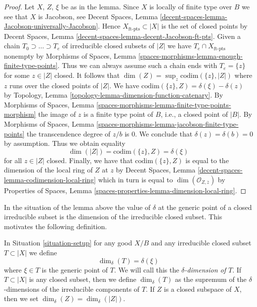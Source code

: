 \begin{proof}
Let $X$, $Z$, $\xi$ be as in the lemma.
Since $X$ is locally of finite type over $B$ we see that $X$ is Jacobson, see
Decent Spaces, Lemma
\ref{decent-spaces-lemma-Jacobson-universally-Jacobson}.
Hence $X_{\text{ft-pts}} \subset |X|$ is the set of closed points
by Decent Spaces, Lemma \ref{decent-spaces-lemma-decent-Jacobson-ft-pts}.
Given a chain $T_0 \supset \ldots \supset T_e$
of irreducible closed subsets of $|Z|$ we have
$T_e \cap X_{\text{ft-pts}}$ nonempty by
Morphisms of Spaces, Lemma
\ref{spaces-morphisms-lemma-enough-finite-type-points}.
Thus we can always assume such a chain ends
with $T_e = \{z\}$ for some $z \in |Z|$ closed.
It follows that $\dim(Z) = \sup_z \text{codim}(\{z\}, |Z|)$
where $z$ runs over the closed points of $|Z|$.
We have $\text{codim}(\{z\}, Z) = \delta(\xi) - \delta(z)$
by Topology, Lemma \ref{topology-lemma-dimension-function-catenary}.
By Morphisms of Spaces, Lemma
\ref{spaces-morphisms-lemma-finite-type-points-morphism}
the image of $z$ is a finite type point of $B$, i.e.,
a closed point of $|B|$. By
Morphisms of Spaces, Lemma
\ref{spaces-morphisms-lemma-jacobson-finite-type-points}
the transcendence degree of $z/b$ is $0$.
We conclude that $\delta(z) = \delta(b) = 0$ by assumption.
Thus we obtain equality
$$
\dim(|Z|) = \text{codim}(\{z\}, Z) = \delta(\xi)
$$
for all $z \in |Z|$ closed. Finally, we have that
$\text{codim}(\{z\}, Z)$ is equal to the dimension of the
local ring of $Z$ at $z$ by
Decent Spaces, Lemma \ref{decent-spaces-lemma-codimension-local-ring}
which in turn is equal to
$\dim(\mathcal{O}_{Z, \overline{z}})$ by
Properties of Spaces, Lemma \ref{spaces-properties-lemma-dimension-local-ring}.
\end{proof}

\noindent
In the situation of the lemma above the value of $\delta$
at the generic point of a closed irreducible subset
is the dimension of the irreducible closed subset.
This motivates the following definition.

\begin{definition}
\label{definition-delta-dimension}
In Situation \ref{situation-setup} for any good $X/B$
and any irreducible closed subset $T \subset |X|$ we define
$$
\dim_\delta(T) = \delta(\xi)
$$
where $\xi \in T$ is the generic point of $T$.
We will call this the {\it $\delta$-dimension of $T$}.
If $T \subset |X|$ is any closed subset, then we define
$\dim_\delta(T)$ as the supremum of the $\delta$-dimensions
of the irreducible components of $T$.
If $Z$ is a closed subspace of $X$, then we set
$\dim_\delta(Z) = \dim_\delta(|Z|)$.
\end{definition}

